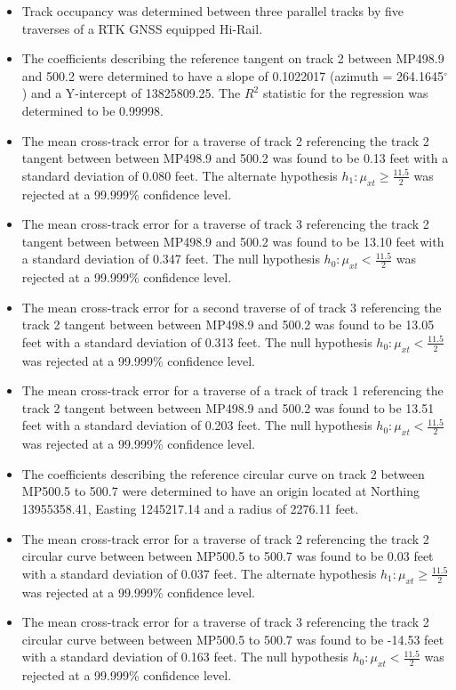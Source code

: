 \begin{enumerate}
\begin{itemize}
\item Track occupancy was determined between three parallel tracks by five traverses of a RTK GNSS equipped Hi-Rail.
\item The coefficients describing the reference tangent on track 2 between MP498.9 and 500.2 were determined to have a slope of  0.1022017 (azimuth = 264.1645$^{\circ}$) and a Y-intercept of 13825809.25. The ${R^2}$ statistic for the regression was determined to be 0.99998.
\item The mean cross-track error for a traverse of track 2 referencing the track 2 tangent between between MP498.9 and 500.2 was found to be 0.13 feet with a standard deviation of 0.080 feet. The alternate hypothesis $h_{1}: \mu_{xt} \ge \frac{11.5}{2}$ was rejected at a 99.999\% confidence level.
\item The mean cross-track error for a traverse of track 3 referencing the track 2 tangent between between MP498.9 and 500.2 was found to be 13.10 feet with a standard deviation of 0.347 feet. The null hypothesis $h_{0}: \mu_{xt} < \frac{11.5}{2}$ was rejected at a 99.999\% confidence level.
\item The mean cross-track error for a second traverse of of track 3 referencing the track 2 tangent between between MP498.9 and 500.2 was found to be 13.05 feet with a standard deviation of 0.313 feet. The null hypothesis $h_{0}: \mu_{xt} < \frac{11.5}{2}$ was rejected at a 99.999\% confidence level.
\item The mean cross-track error for a traverse of a track of track 1 referencing the track 2 tangent between between MP498.9 and 500.2 was found to be 13.51 feet with a standard deviation of 0.203 feet. The null hypothesis $h_{0}: \mu_{xt} < \frac{11.5}{2}$ was rejected at a 99.999\% confidence level.
\item The coefficients describing the reference circular curve on track 2 between MP500.5 to 500.7 were determined to have an origin located at Northing 13955358.41, Easting 1245217.14 and a radius of 2276.11 feet.
\item The mean cross-track error for a traverse of track 2 referencing the track 2 circular curve between between MP500.5 to 500.7 was found to be 0.03 feet with a standard deviation of 0.037 feet. The alternate hypothesis $h_{1}: \mu_{xt} \ge \frac{11.5}{2}$ was rejected at a 99.999\% confidence level.
\item The mean cross-track error for a traverse of track 3 referencing the track 2 circular curve between between MP500.5 to 500.7 was found to be -14.53 feet with a standard deviation of 0.163 feet. The null hypothesis $h_{0}: \mu_{xt} < \frac{11.5}{2}$ was rejected at a 99.999\% confidence level.

\end{itemize}
\end{enumerate}
